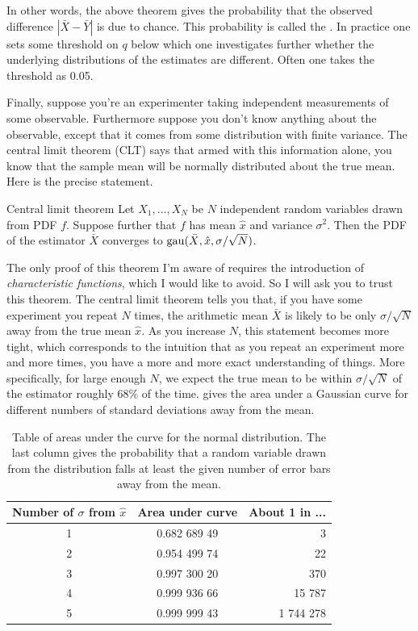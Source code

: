 In other words, the above theorem gives the probability that the
observed difference $|\bar{X}-\bar{Y}|$ is due to chance. This probability
is called the . In practice one sets some
threshold on $q$ below which one investigates further whether the
underlying distributions of the estimates are different. Often one
takes the threshold as 0.05.

Finally, suppose you're an experimenter taking independent measurements of
some observable. Furthermore suppose you don't know anything about the
observable, except that it comes from some distribution with finite variance.
The central limit theorem (CLT) says that armed with this information alone,
you know that the sample mean will be normally distributed about
the true mean. Here is the precise statement.
\begin{theorem}{Central limit theorem}{}
  Let $X_1,...,X_N$ be $N$ independent random variables drawn from PDF $f$.
  Suppose further that $f$ has mean $\hat{x}$ and variance $\sigma^2$.
  Then the PDF of the estimator $\bar{X}$ converges to
  $\operatorname{gau}(\bar{X},\hat{x},\sigma/\sqrt{N})$.
\end{theorem}
The only proof of this theorem I'm aware of requires the introduction of
{\it characteristic functions}, which I would like to avoid. So I will ask you
to trust this theorem. The central limit theorem tells you that, if you have
some experiment you repeat $N$ times, the arithmetic mean $\bar{X}$ is likely to
be only $\sigma/\sqrt{N}$ away from the true mean $\hat{x}$. As you increase
$N$, this statement becomes more tight, which corresponds to the intuition that
as you repeat an experiment more and more times, you have a more and more exact
understanding of things.
More specifically, for large enough $N$, we expect the true mean to be within
$\sigma/\sqrt{N}$ of the estimator roughly 68\% of the time.
 gives the area under a Gaussian curve
for different numbers of standard deviations away from the mean.

\begin{table}
\centering
\caption{Table of areas under the curve for the normal distribution.
The last column gives the probability that a random variable
drawn from the distribution falls at least the given number of error bars
away from the mean.}
\begin{tabularx}{\linewidth}{cCr}
\hline\hline
Number of $\sigma$ from $\hat{x}$ & Area under curve & About 1 in ...\\
 & 0.682 689 49 & 3\\
2 & 0.954 499 74 & 22\\
3 & 0.997 300 20 & 370\\
4 & 0.999 936 66 & 15 787\\
5 & 0.999 999 43 & 1 744 278\\
\hline\hline
\end{tabularx}
\label{tab:normal}
\end{table}



